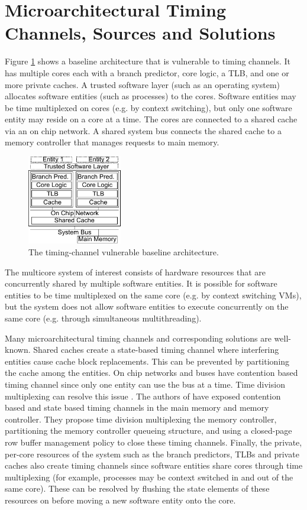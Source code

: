 \section{Microarchitectural Timing Channels, Sources and Solutions}
Figure \ref{fig:baseline} shows a baseline architecture that is vulnerable to 
timing channels. It has multiple cores each with a branch predictor, core 
logic, a TLB, and one or more private caches. A trusted software layer (such as 
an operating system) allocates software entities (such as processes) to the 
cores. Software entities may be time multiplexed on cores (e.g. by context 
switching), but only one software entity may reside on a core at a time. The 
cores are connected to a shared cache via an on chip network. A shared system 
bus connects the shared cache to a memory controller that manages requests to 
main memory.
    \begin{figure}
        \begin{center}
            \includegraphics[width=1.62in]{figs/baseline.pdf}
            \caption{The timing-channel vulnerable baseline architecture.}
            \label{fig:baseline}
        \end{center}
    \end{figure}

The multicore system of interest consists of hardware resources that are
concurrently shared by multiple software entities. It is possible for software 
entities to be time multiplexed on the same core (e.g.  by context switching 
VMs), but the system does not allow software entities to execute concurrently 
on the same core (e.g. through simultaneous multithreading). 

Many microarchitectural timing channels and corresponding solutions are 
well-known. Shared caches create a state-based timing channel where interfering 
entities cause cache block replacements. This can be prevented by partitioning 
the cache among the entities. On chip networks and buses have contention based 
timing channel since only one entity can use the bus at a time. Time division 
multiplexing can resolve this issue \cite{yaonocs}. The authors of 
\cite{ushpca14} have exposed contention based and state based timing channels 
in the main memory and memory controller. They propose time division 
multiplexing the memory controller, partitioning the memory controller queueing 
structure, and using a closed-page row buffer management policy to close these 
timing channels. Finally, the private, per-core resources of the system such as 
the branch predictors, TLBs and private caches also create timing channels 
since software entities share cores through time multiplexing (for example, 
processes may be context switched in and out of the same core). These can be 
resolved by flushing the state elements of these resources on before moving a 
new software entity onto the core.

